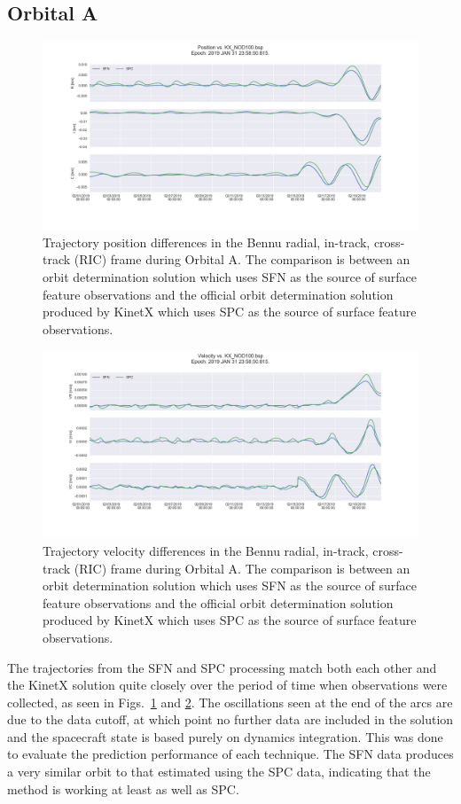 \documentclass{src/RPI-SIW}
\begin{document}
\subsection*{Orbital A}
\begin{figure}[h]
	\centering
	\includegraphics[width=\columnwidth]{orbita_pfig.png}
    \caption{Trajectory position differences in the Bennu radial, in-track, cross-track (RIC) frame during Orbital A.  The comparison is between an orbit determination solution which uses SFN as the source of surface feature observations and the official orbit determination solution produced by KinetX which uses SPC as the source of surface feature observations.}
    \label{fig:oapos}
\end{figure}
\begin{figure}[h]
	\centering
	\includegraphics[width=\columnwidth]{orbita_vfig.png}
    \caption{Trajectory velocity differences in the Bennu radial, in-track, cross-track (RIC) frame during Orbital A.  The comparison is between an orbit determination solution which uses SFN as the source of surface feature observations and the official orbit determination solution produced by KinetX which uses SPC as the source of surface feature observations.}
    \label{fig:oavel}
\end{figure}
The trajectories from the SFN and SPC processing match both each other and the KinetX solution quite closely over the period of time when observations were collected, as seen in Figs.~\ref{fig:oapos} and \ref{fig:oavel}.  The oscillations seen at the end of the arcs are due to the data cutoff, at which point no further data are included in the solution and the spacecraft state is based purely on dynamics integration.  This was done to evaluate the prediction performance of each technique.  The SFN data produces a very similar orbit to that estimated using the SPC data, indicating that the method is working at least as well as SPC.
\end{document}
